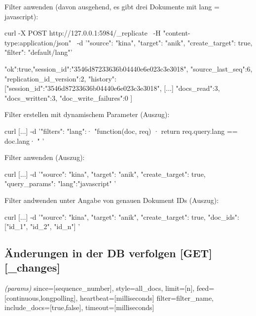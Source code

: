 \documentclass[19pt,landscape,twocolumn]{article}
\newcommand{\htmlverb}[1]{{[}\textbf{{#1}}{]}}
\newcommand{\brackets}[1]{{[}{#1}{]}}
\newcommand{\setparskip}{\setlength{\parskip}{-6mm}}
\newcommand{\resetparskip}{\setlength{\parskip}{1mm}}
\begin{document}
Filter anwenden (davon ausgehend, es gibt drei Dokumente mit lang = javascript):

\begin{code}
curl -X POST http://127.0.0.1:5984/_replicate \
     -H "content-type:application/json" \
     -d '{"source": "kina",
          "target": "anik",
          "create_target": true,
          "filter": "default/lang"}'
\end{code}
\setparskip
\begin{response}
{"ok":true,"session_id":"3546d87233636b04440e6e023c3e3018",
 "source_last_seq":6,
 "replication_id_version":2, "history":
  [{"session_id":"3546d87233636b04440e6e023c3e3018",
    [...]
    "docs_read":3,
    "docs_written":3,
    "doc_write_failures":0
  }]
}
\end{response}
\resetparskip

Filter erstellen mit dynamischem Parameter (Auszug):

\begin{code}
curl [...]
  -d '{"filters":{
       "lang":·
         "function(doc, req) {·
           return req.query.lang == doc.lang·
         }"
       }
    }'
\end{code}

Filter anwenden (Auszug):

\begin{code}
curl [...]
  -d '{"source": "kina",
       "target": "anik",
       "create_target": true,
       "query_params": {
          "lang":"javascript"
       }
     }'
\end{code}

Filter andwenden unter Angabe von genauen Dokument IDs (Auszug):

\begin{code}
curl [...]
  -d '{"source": "kina",
       "target": "anik",
       "create_target": true,
       "doc_ids": ["id_1", "id_2", "id_n"]
     }'
\end{code}

\subsection{Änderungen in der DB verfolgen \htmlverb{GET} \htmlverb{\_changes}}
\emph{(params)} since=\brackets{sequence\_number}, style=all\_docs, limit=\brackets{n}, \newline
feed=\brackets{continuous,longpolling}, heartbeat=\brackets{milliseconds} \newline
filter=filter\_name, include\_docs=\brackets{true,false}, timeout=\brackets{milliseconds}
\end{document}
